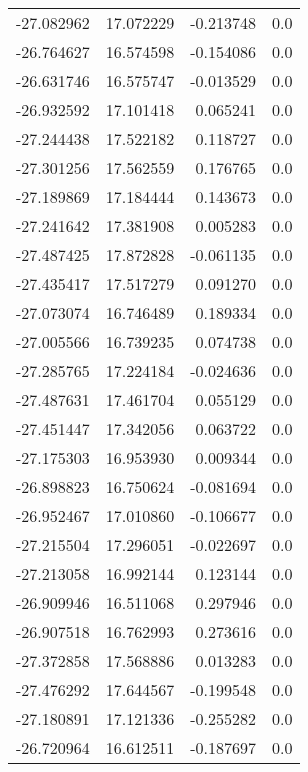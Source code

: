 \begin{tabular}{rrrr}
      -27.082962 &        17.072229 &   -0.213748 &   0.0 \\
      -26.764627 &        16.574598 &   -0.154086 &   0.0 \\
      -26.631746 &        16.575747 &   -0.013529 &   0.0 \\
      -26.932592 &        17.101418 &    0.065241 &   0.0 \\
      -27.244438 &        17.522182 &    0.118727 &   0.0 \\
      -27.301256 &        17.562559 &    0.176765 &   0.0 \\
      -27.189869 &        17.184444 &    0.143673 &   0.0 \\
      -27.241642 &        17.381908 &    0.005283 &   0.0 \\
      -27.487425 &        17.872828 &   -0.061135 &   0.0 \\
      -27.435417 &        17.517279 &    0.091270 &   0.0 \\
      -27.073074 &        16.746489 &    0.189334 &   0.0 \\
      -27.005566 &        16.739235 &    0.074738 &   0.0 \\
      -27.285765 &        17.224184 &   -0.024636 &   0.0 \\
      -27.487631 &        17.461704 &    0.055129 &   0.0 \\
      -27.451447 &        17.342056 &    0.063722 &   0.0 \\
      -27.175303 &        16.953930 &    0.009344 &   0.0 \\
      -26.898823 &        16.750624 &   -0.081694 &   0.0 \\
      -26.952467 &        17.010860 &   -0.106677 &   0.0 \\
      -27.215504 &        17.296051 &   -0.022697 &   0.0 \\
      -27.213058 &        16.992144 &    0.123144 &   0.0 \\
      -26.909946 &        16.511068 &    0.297946 &   0.0 \\
      -26.907518 &        16.762993 &    0.273616 &   0.0 \\
      -27.372858 &        17.568886 &    0.013283 &   0.0 \\
      -27.476292 &        17.644567 &   -0.199548 &   0.0 \\
      -27.180891 &        17.121336 &   -0.255282 &   0.0 \\
      -26.720964 &        16.612511 &   -0.187697 &   0.0 \\

\end{tabular}
